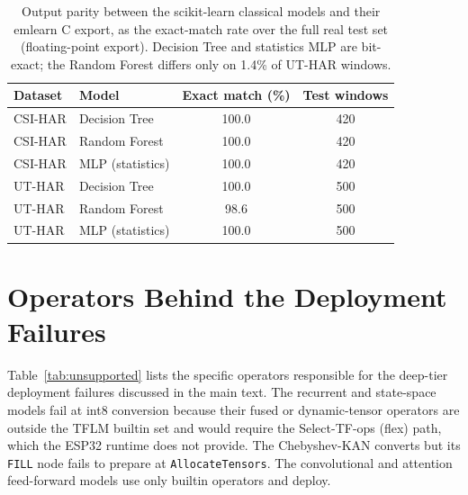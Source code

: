 \documentclass[10pt,journal,twocolumn]{IEEEtran}
\begin{document}
\begin{table}[t]
\caption{Output parity between the scikit-learn classical models and their emlearn C export, as the exact-match rate over the full real test set (floating-point export). Decision Tree and statistics MLP are bit-exact; the Random Forest differs only on 1.4\% of UT-HAR windows.}
\label{tab:emlearnparity}
\centering
\footnotesize
\begin{tabular}{llcc}
\toprule
Dataset & Model & Exact match (\%) & Test windows \\
\midrule
CSI-HAR & Decision Tree    & 100.0 & 420 \\
CSI-HAR & Random Forest    & 100.0 & 420 \\
CSI-HAR & MLP (statistics) & 100.0 & 420 \\
UT-HAR  & Decision Tree    & 100.0 & 500 \\
UT-HAR  & Random Forest    & 98.6  & 500 \\
UT-HAR  & MLP (statistics) & 100.0 & 500 \\
\bottomrule
\end{tabular}
\end{table}

\section{Operators Behind the Deployment Failures}
Table~\ref{tab:unsupported} lists the specific operators responsible for the deep-tier deployment failures discussed in the main text. The recurrent and state-space models fail at int8 conversion because their fused or dynamic-tensor operators are outside the TFLM builtin set and would require the Select-TF-ops (flex) path, which the ESP32 runtime does not provide. The Chebyshev-KAN converts but its \texttt{FILL} node fails to prepare at \texttt{AllocateTensors}. The convolutional and attention feed-forward models use only builtin operators and deploy.

\begin{table}[t]
\caption{Operators responsible for the deployment failures, by model and failing stage.}
\label{tab:unsupported}
\centering
\footnotesize
\setlength{\tabcolsep}{4pt}
\end{table}
\end{document}
